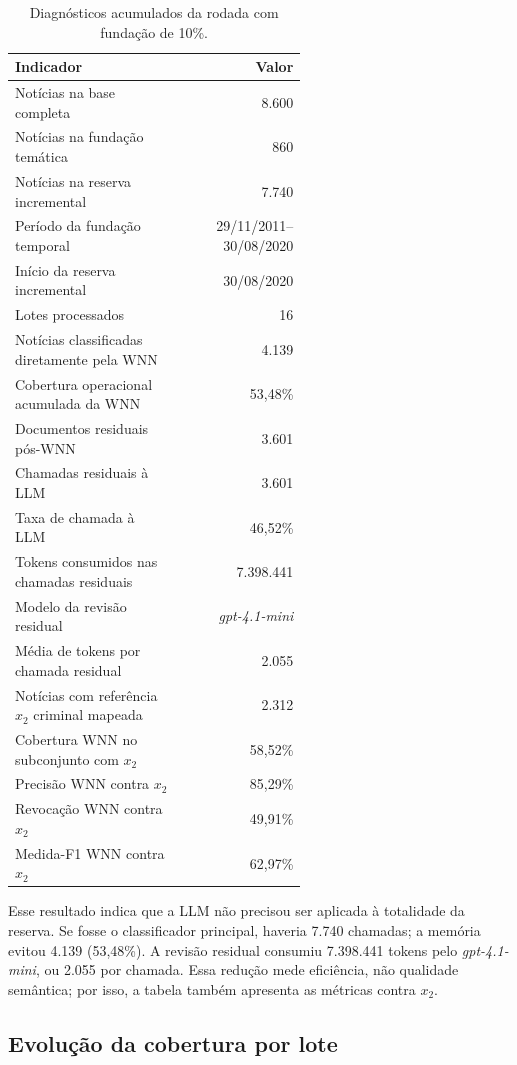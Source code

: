 \begin{table}[ht]
\centering
\caption{Diagnósticos acumulados da rodada com fundação de 10\%.}
\label{tab:resultados-cobertura}
\scriptsize
\begin{tabular}{p{0.58\linewidth}r}
\hline
\textbf{Indicador} & \textbf{Valor} \\
\hline
Notícias na base completa & 8.600 \\
Notícias na fundação temática & 860 \\
Notícias na reserva incremental & 7.740 \\
Período da fundação temporal & 29/11/2011--30/08/2020 \\
Início da reserva incremental & 30/08/2020 \\
Lotes processados & 16 \\
Notícias classificadas diretamente pela WNN & 4.139 \\
Cobertura operacional acumulada da WNN & 53,48\% \\
Documentos residuais pós-WNN & 3.601 \\
Chamadas residuais à LLM & 3.601 \\
Taxa de chamada à LLM & 46,52\% \\
Tokens consumidos nas chamadas residuais & 7.398.441 \\
Modelo da revisão residual & \textit{gpt-4.1-mini} \\
Média de tokens por chamada residual & 2.055 \\
Notícias com referência $x_2$ criminal mapeada & 2.312 \\
Cobertura WNN no subconjunto com $x_2$ & 58,52\% \\
Precisão WNN contra $x_2$ & 85,29\% \\
Revocação WNN contra $x_2$ & 49,91\% \\
Medida-F1 WNN contra $x_2$ & 62,97\% \\
\hline
\end{tabular}
\end{table}

Esse resultado indica que a LLM não precisou ser aplicada à totalidade da reserva. Se fosse o classificador principal, haveria 7.740 chamadas; a memória evitou 4.139 (53,48\%). A revisão residual consumiu 7.398.441 tokens pelo \textit{gpt-4.1-mini}, ou 2.055 por chamada. Essa redução mede eficiência, não qualidade semântica; por isso, a tabela também apresenta as métricas contra $x_2$.

\subsection{Evolução da cobertura por lote}

